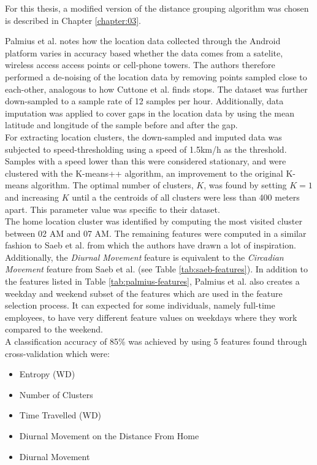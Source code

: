 For this thesis, a modified version of the distance grouping algorithm was chosen is described in Chapter \ref{chapter:03}.

Palmius et al. notes how the location data collected through the Android platform varies in accuracy based whether the data comes from a satelite, wireless access access points or cell-phone towers. The authors therefore performed a de-noising of the location data by removing points sampled close to each-other, analogous to how Cuttone et al. finds stops. The dataset was further down-sampled to a sample rate of 12 samples per hour. Additionally, data imputation was applied to cover gaps in the location data by using the mean latitude and longitude of the sample before and after the gap. \\

For extracting location clusters, the down-sampled and imputed data was subjected to speed-thresholding using a speed of 1.5km/h as the threshold. Samples with a speed lower than this were considered stationary, and were clustered with the K-means++ algorithm, an improvement to the original K-means algorithm. The optimal number of clusters, $K$, was found by setting $K=1$ and increasing $K$ until a the centroids of all clusters were less than 400 meters apart. This parameter value was specific to their dataset.\\

The home location cluster was identified by computing the most visited cluster between 02 AM and 07 AM. The remaining features were computed in a similar fashion to Saeb et al. from which the authors have drawn a lot of inspiration. Additionally, the \textit{Diurnal Movement} feature is equivalent to the \textit{Circadian Movement }feature from Saeb et al. (see Table \ref{tab:saeb-features}). In addition to the features listed in Table \ref{tab:palmius-features}, Palmius et al. also creates a weekday and weekend subset of the features which are used in the feature selection process. It can expected for some individuals, namely full-time employees, to have very different feature values on weekdays where they work compared to the weekend.\\

A classification accuracy of 85\% was achieved by using 5 features found through cross-validation which were:

\begin{itemize}
    \item Entropy (WD)
    \item Number of Clusters
    \item Time Travelled (WD)
    \item Diurnal Movement on the Distance From Home
    \item Diurnal Movement
\end{itemize}

